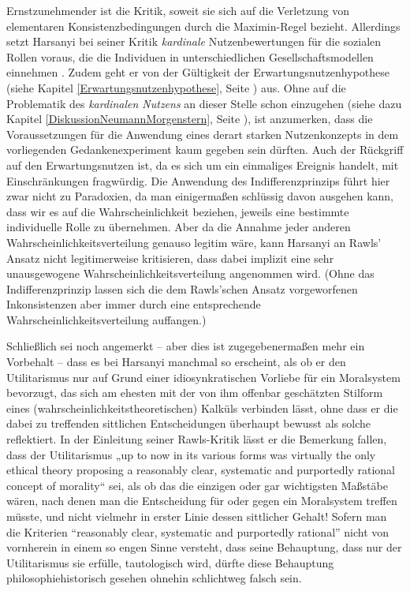 Ernstzunehmender ist die Kritik, soweit sie sich auf die Verletzung von
elementaren Konsistenzbedingungen durch die Maximin-Regel bezieht. Allerdings
setzt Harsanyi bei seiner Kritik {\em kardinale} Nutzenbewertungen für die
sozialen Rollen voraus, die die Individuen in unterschiedlichen Gesellschaftsmodellen
einnehmen \cite[S. 48f.]{harsanyi:1975}. Zudem geht er von der Gültigkeit der
Erwartungsnutzenhypothese (siehe Kapitel \ref{Erwartungsnutzenhypothese}, Seite
\pageref{Erwartungsnutzenhypothese}) aus. Ohne auf die Problematik des {\em
kardinalen Nutzens} an dieser Stelle schon einzugehen (siehe dazu Kapitel
\ref{DiskussionNeumannMorgenstern}, Seite
\pageref{DiskussionNeumannMorgenstern}), ist anzumerken, dass die Voraussetzungen
für die Anwendung eines derart starken Nutzenkonzepts in dem vorliegenden
Gedankenexperiment kaum gegeben sein dürften. Auch der Rückgriff auf den
Erwartungsnutzen ist, da es sich um ein einmaliges Ereignis handelt, mit
Einschränkungen fragwürdig. Die Anwendung des Indifferenzprinzips führt 
hier zwar nicht zu Paradoxien, da man einigermaßen schlüssig davon ausgehen kann,
dass wir es auf die Wahrscheinlichkeit beziehen, jeweils eine bestimmte
individuelle Rolle zu übernehmen. Aber da die Annahme jeder anderen
Wahrscheinlichkeitsverteilung genauso legitim wäre, kann Harsanyi an Rawls'
Ansatz nicht legitimerweise kritisieren, dass dabei implizit eine sehr
unausgewogene Wahrscheinlichkeitsverteilung angenommen wird. (Ohne das
Indifferenzprinzip lassen sich die dem Rawls'schen Ansatz vorgeworfenen
Inkonsistenzen aber immer durch eine entsprechende
Wahrscheinlichkeitsverteilung auffangen.)

Schließlich sei noch angemerkt – aber dies ist zugegebenermaßen mehr ein
Vorbehalt – dass es bei Harsanyi manchmal so erscheint, als ob er den
Utilitarismus nur auf Grund einer idiosynkratischen Vorliebe für ein Moralsystem
bevorzugt, das sich am ehesten mit der von ihm offenbar geschätzten Stilform
eines (wahrscheinlichkeitstheoretischen) Kalküls verbinden lässt, ohne dass er
die dabei zu treffenden sittlichen Entscheidungen überhaupt bewusst als
solche reflektiert. In der Einleitung seiner Rawls-Kritik lässt er die Bemerkung
fallen, dass der Utilitarismus „up to now in its various forms was virtually the
only ethical theory proposing a reasonably clear, systematic and purportedly
rational concept of morality“ \cite[]{harsanyi:1975} sei, als ob das die einzigen
oder gar wichtigsten Maßstäbe wären, nach denen man die Entscheidung für oder
gegen ein Moralsystem treffen müsste, und nicht vielmehr in erster Linie dessen
sittlicher Gehalt! Sofern man die Kriterien "`reasonably clear, systematic and
purportedly rational"' nicht von vornherein in einem so engen Sinne versteht,
dass seine Behauptung, dass nur der Utilitarismus sie erfülle, tautologisch
wird, dürfte diese Behauptung philosophiehistorisch gesehen ohnehin schlichtweg
falsch sein.


